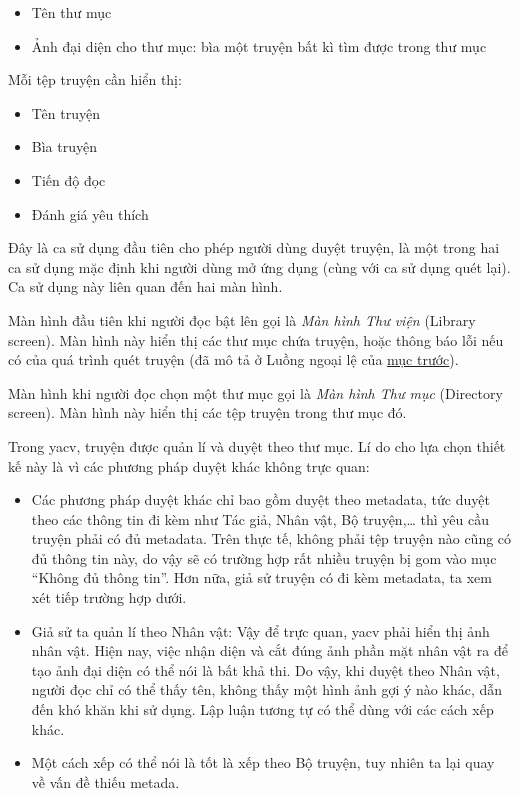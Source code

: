 \documentclass[
]{article}
\providecommand{\tightlist}{%
  \setlength{\itemsep}{0pt}\setlength{\parskip}{0pt}}
\begin{document}
\begin{itemize}
  \begin{itemize}
  \tightlist
  \item
    Tên thư mục
  \item
    Ảnh đại diện cho thư mục: bìa một truyện bất kì tìm được trong thư
    mục
  \end{itemize}

  Mỗi tệp truyện cần hiển thị:

  \begin{itemize}
  \tightlist
  \item
    Tên truyện
  \item
    Bìa truyện
  \item
    Tiến độ đọc
  \item
    Đánh giá yêu thích
  \end{itemize}
\end{itemize}

Đây là ca sử dụng đầu tiên cho phép người dùng duyệt truyện, là một
trong hai ca sử dụng mặc định khi người dùng mở ứng dụng (cùng với ca sử
dụng quét lại). Ca sử dụng này liên quan đến hai màn hình.

Màn hình đầu tiên khi người đọc bật lên gọi là \emph{Màn hình Thư viện}
(Library screen). Màn hình này hiển thị các thư mục chứa truyện, hoặc
thông báo lỗi nếu có của quá trình quét truyện (đã mô tả ở Luồng ngoại
lệ của \protect\hyperlink{P3.3.1-scan}{mục trước}).

Màn hình khi người đọc chọn một thư mục gọi là \emph{Màn hình Thư mục}
(Directory screen). Màn hình này hiển thị các tệp truyện trong thư mục
đó.

Trong yacv, truyện được quản lí và duyệt theo thư mục. Lí do cho lựa
chọn thiết kế này là vì các phương pháp duyệt khác không trực quan:

\begin{itemize}
\tightlist
\item
  Các phương pháp duyệt khác chỉ bao gồm duyệt theo metadata, tức duyệt
  theo các thông tin đi kèm như Tác giả, Nhân vật, Bộ truyện,\ldots{}
  thì yêu cầu truyện phải có đủ metadata. Trên thực tế, không phải tệp
  truyện nào cũng có đủ thông tin này, do vậy sẽ có trường hợp rất nhiều
  truyện bị gom vào mục ``Không đủ thông tin''. Hơn nữa, giả sử truyện
  có đi kèm metadata, ta xem xét tiếp trường hợp dưới.
\item
  Giả sử ta quản lí theo Nhân vật: Vậy để trực quan, yacv phải hiển thị
  ảnh nhân vật. Hiện nay, việc nhận diện và cắt đúng ảnh phần mặt nhân
  vật ra để tạo ảnh đại diện có thể nói là bất khả thi. Do vậy, khi
  duyệt theo Nhân vật, người đọc chỉ có thể thấy tên, không thấy một
  hình ảnh gợi ý nào khác, dẫn đến khó khăn khi sử dụng. Lập luận tương
  tự có thể dùng với các cách xếp khác.
\item
  Một cách xếp có thể nói là tốt là xếp theo Bộ truyện, tuy nhiên ta lại
  quay về vấn đề thiếu metada.
\end{itemize}
\end{document}
